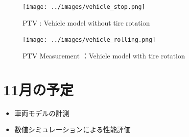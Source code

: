 \documentclass[twocolumn,a4j]{jsarticle}
\begin{document}
\begin{figure}[htbp]
	\centering
	\texttt{[image: ../images/vehicle\_stop.png]}
	\caption{PTV : Vehicle model without tire rotation}
\end{figure}

\newpage
\begin{figure}[htbp]
	\centering
	\texttt{[image: ../images/vehicle\_rolling.png]}
	\caption{PTV Measurement ：Vehicle model with tire rotation}
\end{figure}

\section{11月の予定}
\begin{itemize}
	\item 車両モデルの計測
	\item 数値シミュレーションによる性能評価
\end{itemize}
\end{document}
